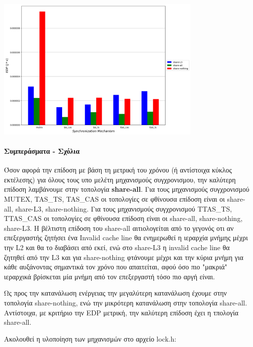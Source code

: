 \begin{minipage}{\textwidth}
   \begin{center}
      \\
      \vspace{3mm}
      \includegraphics[width=0.75\textwidth, frame]{./graphs/sniper/threads/topology-edp-analysis.png}
      \vspace{6mm}
   \end{center}
\end{minipage}

\paragraph{Συμπεράσματα - Σχόλια}
Όσον αφορά την επίδοση με βάση τη μετρική του χρόνου (ή αντίστοιχα κύκλος
εκτέλεσης) για όλους τους υπο μελέτη μηχανισμούς συγχρονισμου, την καλύτερη
επίδοση λαμβάνουμε στην τοπολογία \textbf{share-all}. Για τους μηχανισμούς
συγχρονισμού MUTEX, TAS\_TS, TAS\_CAS οι τοπολογίες σε φθίνουσα επίδοση είναι οι
share-all, share-L3, share-nothing. Για τους μηχανισμούς συγχρονισμού TTAS\_TS,
TTAS\_CAS οι τοπολογίες σε φθίνουσα επίδοση είναι οι share-all, share-nothing,
share-L3. Η βέλτιστη επίδοση του share-all αιτιολογείται από το γεγονός οτι αν
επεξεργαστής ζητήσει ένα Invalid cache line θα ενημερωθεί η ιεραρχία μνήμης
μέχρι την L2 και θα το διαβάσει από εκεί, ενώ στο share-L3 η invalid cache line
θα ζητηθεί από την L3 και για share-nothing φτάνουμε μέχρι και την κύρια μνήμη
για κάθε αυξάνοντας σημαντικά τον χρόνο που απαιτείται, αφού όσο πιο "μακριά"
ιεραρχικά βρίσκεται μία μνήμη από τον επεξεργαστή τόσο πιο αργή είναι.

Ως προς την κατανάλωση ενέργειας την μεγαλύτερη κατανάλωση έχουμε στην τοπολογία 
share-nothing, ενώ την μικρότερη κατανάλωση στην τοπολογία share-all. Αντίστοιχα,
με κριτήριο την EDP μετρική, την καλύτερη επίδοση έχει η τπολογία share-all.
\vspace{1em}

\noindent Ακολουθεί η υλοποίηση των μηχανισμών στο αρχείο lock.h: \vspace{0.5cm}

